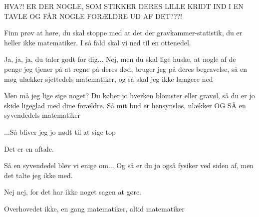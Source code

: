 \documentclass{article}
\begin{document}
\begin{sketch}
 HVA?! ER  DER NOGLE, SOM STIKKER DERES LILLE KRIDT IND I EN TAVLE OG FÅR NOGLE FORÆLDRE UD AF DET???!

 Finn prøv at høre, du skal stoppe med at det der gravkammer-statistik, du er heller ikke matematiker. I så fald skal vi ned til en ottenedel.

 Ja, ja, ja, du taler godt for dig... Nej, men du skal lige huske, at nogle af de penge jeg tjener på at regne på deres død, bruger jeg på deres begravelse, så en møg ulækker sjettedels matematiker, og så skal jeg ikke længere ned

 Men må jeg lige sige noget?  Du køber jo hverken blomster eller gravøl, så du er jo skide ligeglad med dine forældre. Så mit bud er hensynsløs, ulækker OG SÅ en syvendedels matematiker

\noindent{}

 ...Så bliver jeg jo nødt til at sige top

\noindent{}

 Det er en aftale.

\noindent{}

 Så en syvendedel blev vi enige om...
Og så er du jo også fysiker ved siden af, men det talte jeg ikke med.

 Nej nej, for det har ikke noget sagen at gøre.

 Overhovedet ikke, en gang matematiker, altid matematiker

\end{sketch}
\end{document}
